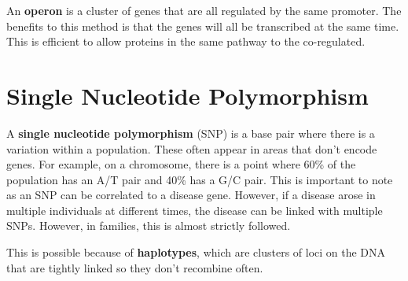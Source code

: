 \documentclass{article}
\begin{document}
An \textbf{operon} is a cluster of genes that are all regulated by the same
promoter. The benefits to this method is that the genes will all be transcribed
at the same time. This is efficient to allow proteins in the same pathway to the
co-regulated.

\section{Single Nucleotide Polymorphism}

A \textbf{single nucleotide polymorphism} (SNP) is a base pair where there is a
variation within a population. These often appear in areas that don't encode
genes. For example, on a chromosome, there is a point where 60\% of the
population has an A/T pair and 40\% has a G/C pair. This is important to note as
an SNP can be correlated to a disease gene. However, if a disease arose in
multiple individuals at different times, the disease can be linked with multiple
SNPs. However, in families, this is almost strictly followed. 

This is possible because of \textbf{haplotypes}, which are clusters of loci on
the DNA that are tightly linked so they don't recombine often.
\end{document}
